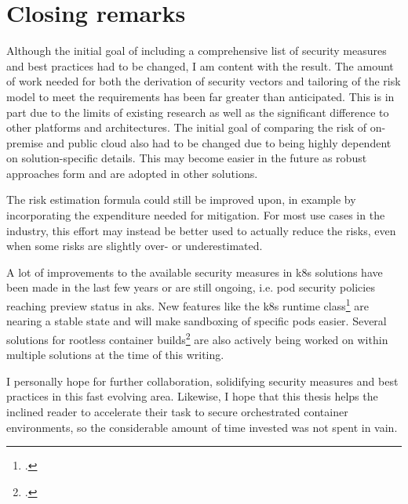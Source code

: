 \newpage
\section{Closing remarks}

Although the initial goal of including a comprehensive list of security measures and best practices had to be changed, I am content with the result. The amount of work needed for both the derivation of security vectors and tailoring of the risk model to meet the requirements has been far greater than anticipated. This is in part due to the limits of existing research as well as the significant difference to other platforms and architectures. The initial goal of comparing the risk of on-premise and public cloud also had to be changed due to being highly dependent on solution-specific details. This may become easier in the future as robust approaches form and are adopted in other solutions.

The risk estimation formula could still be improved upon, in example by incorporating the expenditure needed for mitigation. For most use cases in the industry, this effort may instead be better used to actually reduce the risks, even when some risks are slightly over- or underestimated. 

A lot of improvements to the available security measures in \gls{k8s} solutions have been made in the last few years or are still ongoing, i.e. pod security policies reaching preview status in \gls{aks}. New features like the \gls{k8s} runtime class\footcite[][, section 'Motivation']{runtimeClass} are nearing a stable state and will make sandboxing of specific pods easier. Several solutions for rootless container builds\footcite[][, slides 10 to 11]{rootlessBuilds} are also actively being worked on within multiple solutions at the time of this writing. 

I personally hope for further collaboration, solidifying security measures and best practices in this fast evolving area.
Likewise, I hope that this thesis helps the inclined reader to accelerate their task to secure orchestrated container environments, so the considerable amount of time invested was not spent in vain.
